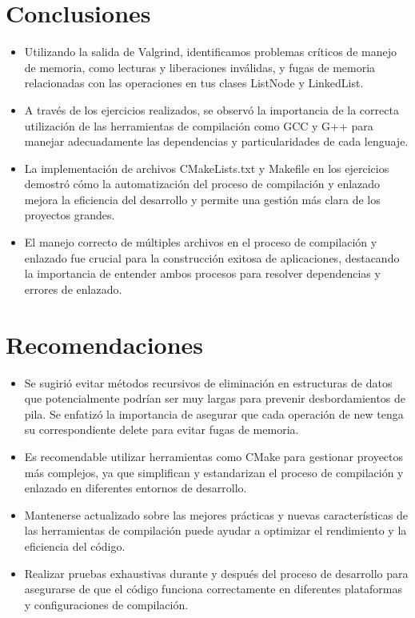 \documentclass[]{article}
\begin{document}
\section{Conclusiones}
    \begin{itemize}
        \item Utilizando la salida de Valgrind, identificamos problemas críticos de manejo de memoria, como lecturas y liberaciones inválidas, y fugas de memoria relacionadas con las operaciones en tus clases ListNode y LinkedList.
        \item A través de los ejercicios realizados, se observó la importancia de la correcta utilización de las herramientas de compilación como GCC y G++ para manejar adecuadamente las dependencias y particularidades de cada lenguaje.
        \item La implementación de archivos CMakeLists.txt y Makefile en los ejercicios demostró cómo la automatización del proceso de compilación y enlazado mejora la eficiencia del desarrollo y permite una gestión más clara de los proyectos grandes.
        \item El manejo correcto de múltiples archivos en el proceso de compilación y enlazado fue crucial para la construcción exitosa de aplicaciones, destacando la importancia de entender ambos procesos para resolver dependencias y errores de enlazado.
    \end{itemize}

\section{Recomendaciones}
    \begin{itemize}
        \item Se sugirió evitar métodos recursivos de eliminación en estructuras de datos que potencialmente podrían ser muy largas para prevenir desbordamientos de pila.
Se enfatizó la importancia de asegurar que cada operación de new tenga su correspondiente delete para evitar fugas de memoria.
        \item  Es recomendable utilizar herramientas como CMake para gestionar proyectos más complejos, ya que simplifican y estandarizan el proceso de compilación y enlazado en diferentes entornos de desarrollo.
        \item Mantenerse actualizado sobre las mejores prácticas y nuevas características de las herramientas de compilación puede ayudar a optimizar el rendimiento y la eficiencia del código.
        \item Realizar pruebas exhaustivas durante y después del proceso de desarrollo para asegurarse de que el código funciona correctamente en diferentes plataformas y configuraciones de compilación.
	\end{itemize}
\end{document}
